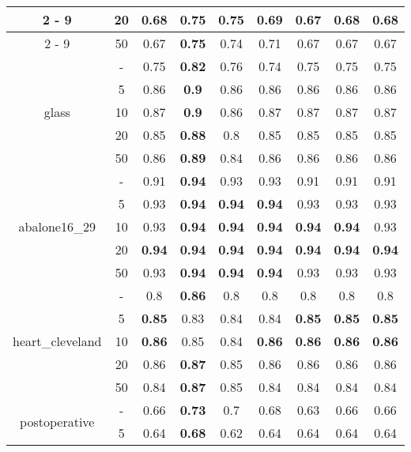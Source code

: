 \begin{table}[H]
\begin{center}
{\begin{tabular}{c|c|ccccccc}
				\cline{2%
					-%
					9}%
				&20&0.68&\textbf{0.75}&\textbf{0.75}&0.69&0.67&0.68&0.68\\%
				\cline{2%
					-%
					9}%
				&50&0.67&\textbf{0.75}&0.74&0.71&0.67&0.67&0.67\\%
				\hline%
				\multirow{5}{*}{glass}&{-}&0.75&\textbf{0.82}&0.76&0.74&0.75&0.75&0.75\\%
				\cline{2%
					-%
					9}%
				&5&0.86&\textbf{0.9}&0.86&0.86&0.86&0.86&0.86\\%
				\cline{2%
					-%
					9}%
				&10&0.87&\textbf{0.9}&0.86&0.87&0.87&0.87&0.87\\%
				\cline{2%
					-%
					9}%
				&20&0.85&\textbf{0.88}&0.8&0.85&0.85&0.85&0.85\\%
				\cline{2%
					-%
					9}%
				&50&0.86&\textbf{0.89}&0.84&0.86&0.86&0.86&0.86\\%
				\hline%
				\multirow{5}{*}{abalone16\_29}&{-}&0.91&\textbf{0.94}&0.93&0.93&0.91&0.91&0.91\\%
				\cline{2%
					-%
					9}%
				&5&0.93&\textbf{0.94}&\textbf{0.94}&\textbf{0.94}&0.93&0.93&0.93\\%
				\cline{2%
					-%
					9}%
				&10&0.93&\textbf{0.94}&\textbf{0.94}&\textbf{0.94}&\textbf{0.94}&\textbf{0.94}&0.93\\%
				\cline{2%
					-%
					9}%
				&20&\textbf{0.94}&\textbf{0.94}&\textbf{0.94}&\textbf{0.94}&\textbf{0.94}&\textbf{0.94}&\textbf{0.94}\\%
				\cline{2%
					-%
					9}%
				&50&0.93&\textbf{0.94}&\textbf{0.94}&\textbf{0.94}&0.93&0.93&0.93\\%
				\hline%
				\multirow{5}{*}{heart\_cleveland}&{-}&0.8&\textbf{0.86}&0.8&0.8&0.8&0.8&0.8\\%
				\cline{2%
					-%
					9}%
				&5&\textbf{0.85}&0.83&0.84&0.84&\textbf{0.85}&\textbf{0.85}&\textbf{0.85}\\%
				\cline{2%
					-%
					9}%
				&10&\textbf{0.86}&0.85&0.84&\textbf{0.86}&\textbf{0.86}&\textbf{0.86}&\textbf{0.86}\\%
				\cline{2%
					-%
					9}%
				&20&0.86&\textbf{0.87}&0.85&0.86&0.86&0.86&0.86\\%
				\cline{2%
					-%
					9}%
				&50&0.84&\textbf{0.87}&0.85&0.84&0.84&0.84&0.84\\%
				\hline%
				\multirow{5}{*}{postoperative}&{-}&0.66&\textbf{0.73}&0.7&0.68&0.63&0.66&0.66\\%
				\cline{2%
					-%
					9}%
				&5&0.64&\textbf{0.68}&0.62&0.64&0.64&0.64&0.64\\%

\end{tabular}}
\end{center}
\end{table}

